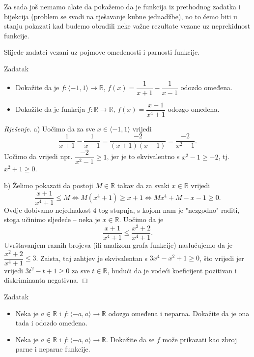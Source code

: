 \begin{remark}
Za sada još nemamo alate da pokažemo da je funkcija iz prethodnog zadatka i bijekcija (problem se svodi na rješavanje kubne jednadžbe), no to ćemo biti u stanju pokazati kad budemo obradili neke važne rezultate vezane uz neprekidnost funkcije. 
\end{remark}
Slijede zadatci vezani uz pojmove omeđenosti i parnosti funkcije.
\begin{exercise}{Zadatak} \textbf{}
\begin{itemize}
\item[a)] Dokažite da je $f : \langle -1, 1\rangle\to \mathbb{R}$, $f(x)=\dfrac{1}{x+1}-\dfrac{1}{x-1}$ odozdo omeđena.
\item[b)] Dokažite da je funkcija $f : \mathbb{R}\to \mathbb{R}$, $f(x)=\dfrac{x+1}{x^4+1}$ odozgo omeđena.
\end{itemize}
\end{exercise}
\begin{proof}[Rješenje]
a) Uočimo da za sve $x\in \langle -1, 1\rangle$ vrijedi
$$\dfrac{1}{x+1}-\dfrac{1}{x-1}=\dfrac{-2}{(x+1)(x-1)}=\dfrac{-2}{x^2-1}.$$
Uočimo da vrijedi npr. $\dfrac{-2}{x^2-1}\geq 1$, jer je to ekvivalentno s $x^2-1\geq -2$, tj. $x^2+1\geq 0$.

b) Želimo pokazati da postoji $M\in \mathbb{R}$ takav da za svaki $x\in \mathbb{R}$ vrijedi 
$$\dfrac{x+1}{x^4+1}\leq M \Leftrightarrow M(x^4+1)\geq x+1 \Leftrightarrow Mx^4+M-x-1\geq 0.$$ Ovdje dobivamo nejednakost $4$-tog stupnja, s kojom nam je "nezgodno" raditi, stoga učinimo sljedeće -- neka je $x\in \mathbb{R}$. Uočimo da je
$$\dfrac{x+1}{x^4+1}\leq \dfrac{x^2+2}{x^4+1}.$$
Uvrštavanjem raznih brojeva (ili analizom grafa funkcije) naslućujemo da je $\dfrac{x^2+2}{x^4+1}\leq 3$. Zaista, taj zahtjev je ekvivalentan s $3x^4-x^2+1\geq 0$, što vrijedi jer vrijedi $3t^2-t+1\geq 0$ za sve $t\in \mathbb{R}$, budući da je vodeći koeficijent pozitivan i diskriminanta negativna.
\end{proof}
\begin{exercise}{Zadatak} \textbf{}
\begin{itemize}
\item[a)] Neka je $a\in \mathbb{R}$ i $f : \langle -a, a\rangle\to \mathbb{R}$ odozgo omeđena i neparna. Dokažite da je ona tada i odozdo omeđena.
\item[b)] Neka je $a\in \mathbb{R}$ i $f : \langle -a, a\rangle\to \mathbb{R}$. Dokažite da se $f$ može prikazati kao zbroj parne i neparne funkcije.
\end{itemize}
\end{exercise}

